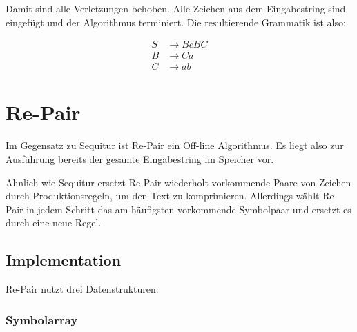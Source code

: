 Damit sind alle Verletzungen behoben. Alle Zeichen aus dem Eingabestring sind eingefügt und der Algorithmus terminiert. Die resultierende Grammatik ist also:

\begin{align*}
	S &\rightarrow BcBC\\
	B &\rightarrow Ca\\
	C &\rightarrow ab
\end{align*}



\section{Re-Pair}

Im Gegensatz zu Sequitur ist Re-Pair \cite{larsson_off-line_2000} ein Off-line Algorithmus. Es liegt also zur Ausführung bereits der gesamte Eingabestring im Speicher vor.

Ähnlich wie Sequitur ersetzt Re-Pair wiederholt vorkommende Paare von Zeichen durch Produktionsregeln, um den Text zu komprimieren. Allerdings wählt Re-Pair in jedem Schritt das am häufigsten vorkommende Symbolpaar und ersetzt es durch eine neue Regel.

\subsection{Implementation}

Re-Pair nutzt drei Datenstrukturen:

\subsubsection{Symbolarray}

